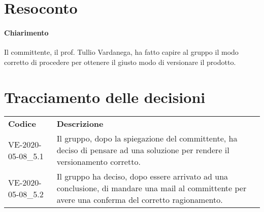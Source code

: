 \documentclass{article}
\begin{document}
\section{Resoconto}%
\label{resoconto}
\paragraph*{Chiarimento}
Il committente, il prof. Tullio Vardanega, ha fatto capire al gruppo il modo corretto di procedere per ottenere il giusto modo di versionare il prodotto.

\section{Tracciamento delle decisioni}
\begin{table}[H]
  \centering
  \begin{tabular}{p{4cm}|p{12cm}}
    \rowcolor{lightgray}
    \textbf{Codice}  & \textbf{Descrizione}      \\
    VE-2020-05-08\_5.1 & Il gruppo, dopo la spiegazione del committente, ha deciso di pensare ad una soluzione per rendere il versionamento corretto. \\
    VE-2020-05-08\_5.2 & Il gruppo ha deciso, dopo essere arrivato ad una conclusione, di mandare una mail al committente per avere una conferma del corretto ragionamento. \\
  \end{tabular}
\end{table}
\end{document}
